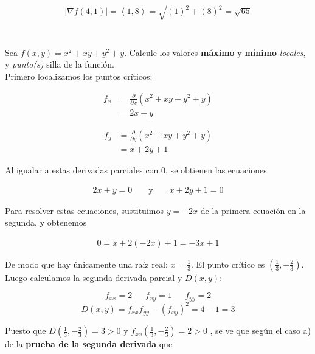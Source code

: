 \documentclass[12pt]{article}
\begin{document}
\begin{align*}
  |\nabla f (4,1)| = \left\langle  1,8 \right\rangle = \sqrt{(1)^2+(8)^2} = \sqrt{65}
\end{align*}


\section{}

Sea $f(x, y) = x^2 + xy + y^2 + y$. Calcule los valores \textbf{máximo} y \textbf{mínimo} \textit{locales}, y \textit{punto(s)} silla de la función. \\

Primero localizamos los puntos críticos:

\begin{align*}
  f_x
  &= \frac{\partial}{\partial x} (x^2 + xy + y^2 + y) \\
  &= 2x + y 
\end{align*}

\begin{align*}
  f_y
  &= \frac{\partial}{\partial y} (x^2 + xy + y^2 + y) \\
  &= x + 2y + 1
\end{align*}

Al igualar a estas derivadas parciales con 0, se obtienen las ecuaciones

\begin{align*}
  2x + y = 0 && \text{ y } && x + 2y + 1=0
\end{align*}

Para resolver estas ecuaciones, sustituimos $y=-2x$ de la primera ecuación en la segunda,
y obtenemos

\begin{align*}
  0 = x + 2(-2x) + 1 = -3x+1
\end{align*}

De modo que hay únicamente una raíz real: $x=\frac{1}{3}$. El punto crítico es $\left(\frac{1}{3}, -\frac{2}{3}\right)$. \\

Luego calculamos la segunda derivada parcial y $D(x, y)$:

$$  f_{xx} = 2 ~~~~~~~ f_{xy} = 1 ~~~~~~~ f_{yy} = 2$$
 $$ D(x,y) = f_{xx}f_{yy} - (f_{xy})^2= 4 - 1 = 3$$

Puesto que $D\left( \frac{1}{3}, -\frac{2}{3} \right) = 3 > 0$ y $f_{xx}\left( \frac{1}{3}, -\frac{2}{3} \right) = 2 > 0$ , se ve que según el caso a) de la \textbf{prueba de la segunda derivada} que
\end{document}

